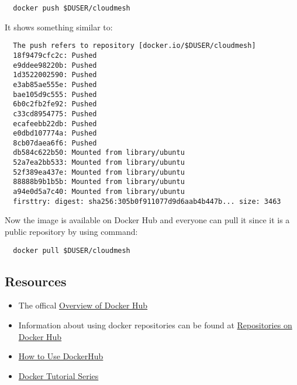\begin{itemize}
\begin{lstlisting}
  docker push $DUSER/cloudmesh
\end{lstlisting}

  It shows something similar to:

\begin{lstlisting}
  The push refers to repository [docker.io/$DUSER/cloudmesh]
  18f9479cfc2c: Pushed 
  e9ddee98220b: Pushed 
  1d3522002590: Pushed 
  e3ab85ae555e: Pushed 
  bae105d9c555: Pushed 
  6b0c2fb2fe92: Pushed 
  c33cd8954775: Pushed 
  ecafeebb22db: Pushed 
  e0dbd107774a: Pushed 
  8cb07daea6f6: Pushed 
  db584c622b50: Mounted from library/ubuntu 
  52a7ea2bb533: Mounted from library/ubuntu 
  52f389ea437e: Mounted from library/ubuntu 
  88888b9b1b5b: Mounted from library/ubuntu 
  a94e0d5a7c40: Mounted from library/ubuntu 
  firsttry: digest: sha256:305b0f911077d9d6aab4b447b... size: 3463
\end{lstlisting}

  Now the image is available on Docker Hub and everyone can pull it
  since it is a public repository by using command:

\begin{lstlisting}
  docker pull $DUSER/cloudmesh
\end{lstlisting}
\end{itemize}

\subsection{Resources}

\begin{itemize}
\item
  The offical
  \href{https://docs.docker.com/docker-hub/\#use-official-repositories}{Overview
  of Docker Hub} \cite{hid-sp18-405-tutorial-dockerhub-overview}
\item
  Information about using docker repositories can be found at
  \href{https://docs.docker.com/docker-hub/repos/}{Repositories on
  Docker Hub} \cite{hid-sp18-405-tutorial-dockerhub-repository}
\item
   \href{https://www.linux.com/blog/learn/intro-to-linux/2018/1/how-use-dockerhub}{How
  to Use DockerHub} \cite{hid-sp18-405-tutorial-dockerhub-blog-use}

\item \href{https://rominirani.com/docker-tutorial-series-part-4-docker-hub-b51fb545dd8e}{Docker
  Tutorial Series}\cite{hid-sp18-405-tutorial-dockerhub-series-part-4}
\end{itemize}


